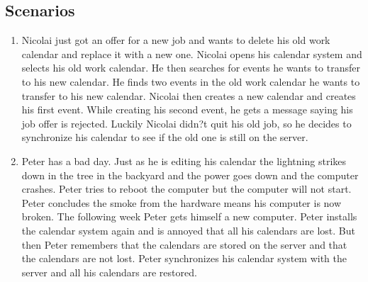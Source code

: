 \subsection{Scenarios}
\begin{enumerate}
\item
Nicolai just got an offer for a new job and wants to delete his old work calendar and replace it with a new one. Nicolai opens his calendar system and selects his old work calendar. He then searches for events he wants to transfer to his new calendar. He finds two events in the old work calendar he wants to transfer to his new calendar. Nicolai then creates a new calendar and creates his first event. While creating his second event, he gets a message saying his job offer is rejected. Luckily Nicolai didn?t quit his old job, so he decides to synchronize his calendar to see if the old one is still on the server.

\item
Peter has a bad day. Just as he is editing his calendar the lightning strikes down in the tree in the backyard and the power goes down and the computer crashes. Peter tries to reboot the computer but the computer will not start. Peter concludes the smoke from the hardware means his computer is now broken. The following week Peter gets himself a new computer. Peter installs the calendar system again and is annoyed that all his calendars are lost. But then Peter remembers that the calendars are stored on the server and that the calendars are not lost.
Peter synchronizes his calendar system with the server and all his calendars are restored.

\end{enumerate}